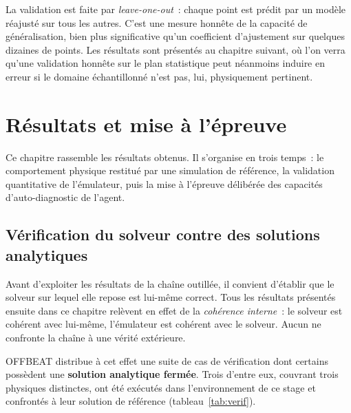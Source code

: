 \documentclass[12pt,a4paper,french]{report}
\begin{document}
La validation est faite par \textit{leave-one-out}~: chaque point est prédit par
un modèle réajusté sur tous les autres. C'est une mesure honnête de la capacité
de généralisation, bien plus significative qu'un coefficient d'ajustement sur
quelques dizaines de points. Les résultats sont présentés au chapitre suivant,
où l'on verra qu'une validation honnête sur le plan statistique peut néanmoins
induire en erreur si le domaine échantillonné n'est pas, lui, physiquement
pertinent.

\clearpage

\chapter{Résultats et mise à l'épreuve}

Ce chapitre rassemble les résultats obtenus. Il s'organise en trois temps~: le
comportement physique restitué par une simulation de référence, la validation
quantitative de l'émulateur, puis la mise à l'épreuve délibérée des capacités
d'auto-diagnostic de l'agent.

\section{Vérification du solveur contre des solutions analytiques}
\label{sec:verification}

Avant d'exploiter les résultats de la chaîne outillée, il convient d'établir
que le solveur sur lequel elle repose est lui-même correct. Tous les résultats
présentés ensuite dans ce chapitre relèvent en effet de la \emph{cohérence
interne}~: le solveur est cohérent avec lui-même, l'émulateur est cohérent avec
le solveur. Aucun ne confronte la chaîne à une vérité extérieure.

OFFBEAT distribue à cet effet une suite de cas de vérification dont certains
possèdent une \textbf{solution analytique fermée}. Trois d'entre eux, couvrant
trois physiques distinctes, ont été exécutés dans l'environnement de ce stage
et confrontés à leur solution de référence (tableau~\ref{tab:verif}).
\end{document}
